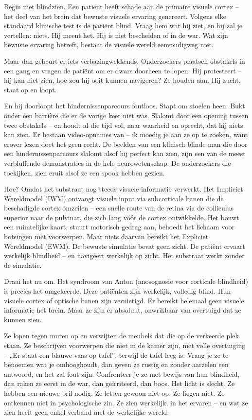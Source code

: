 \documentclass[11pt, twoside, openright]{book}
\begin{document}
Begin met blindzien. Een patiënt heeft schade aan de primaire visuele cortex -- het deel van het brein dat bewuste visuele ervaring genereert. Volgens elke standaard klinische test is de patiënt blind. Vraag hem wat hij ziet, en hij zal je vertellen: niets. Hij meent het. Hij is niet bescheiden of in de war. Wat zijn bewuste ervaring betreft, bestaat de visuele wereld eenvoudigweg niet.

Maar dan gebeurt er iets verbazingwekkends. Onderzoekers plaatsen obstakels in een gang en vragen de patiënt om er dwars doorheen te lopen. Hij protesteert -- hij kan niet zien, hoe zou hij ooit kunnen navigeren? Ze houden aan. Hij zucht, staat op en loopt.

En hij doorloopt het hindernissenparcours foutloos. Stapt om stoelen heen. Bukt onder een barrière die er de vorige keer niet was. Slalomt door een opening tussen twee obstakels -- en houdt al die tijd vol, naar waarheid en oprecht, dat hij niets kan zien. Er bestaan video-opnames van -- ik moedig je aan ze op te zoeken, want erover lezen doet het geen recht. De beelden van een klinisch blinde man die door een hindernissenparcours slalomt alsof hij perfect kan zien, zijn een van de meest verbluffende demonstraties in de hele neurowetenschap. De onderzoekers die toekijken, zien eruit alsof ze een spook hebben gezien.

Hoe? Omdat het substraat nog steeds visuele informatie verwerkt. Het Impliciet Wereldmodel (IWM) ontvangt visuele input via subcorticale banen die de beschadigde cortex omzeilen -- een snelle route van de retina via de colliculus superior naar de pulvinar, die zich lang vóór de cortex ontwikkelde. Het bouwt een ruimtelijke kaart, stuurt motorisch gedrag aan, behoedt het lichaam voor botsingen met voorwerpen. Maar niets daarvan bereikt het Expliciet Wereldmodel (EWM). De bewuste simulatie bevat geen zicht. De patiënt ervaart werkelijk blindheid -- en navigeert werkelijk op zicht. Het substraat werkt zonder de simulatie.

Draai het nu om. Het syndroom van Anton (anosognosie voor corticale blindheid) is precies het omgekeerde. Deze patiënten zijn werkelijk, volledig blind. Hun visuele cortex of optische banen zijn vernietigd. Er bereikt helemaal geen visuele informatie het brein. Maar ze zijn er absoluut, onwrikbaar van overtuigd dat ze kunnen zien.

Ze lopen tegen muren op en verwijten de meubels dat die op de verkeerde plek staan. Ze beschrijven voorwerpen die niet in de kamer zijn, met volle overtuiging -- „Er staat een blauwe vaas op tafel”, terwijl de tafel leeg is. Vraag je ze te benoemen wat je omhooghoudt, dan geven ze rustig en zonder aarzelen een antwoord, en het zal fout zijn. Confronteer je ze met bewijs van hun blindheid, dan raken ze eerst in de war, dan geïrriteerd, dan boos. Het licht is slecht. Ze hebben een nieuwe bril nodig. Ze letten gewoon niet op. Ze liegen niet. Ze ontkennen niet in psychologische zin. Ze zien werkelijk, in het ervaren -- en wat ze zien heeft geen enkel verband met de werkelijke wereld.
\end{document}
